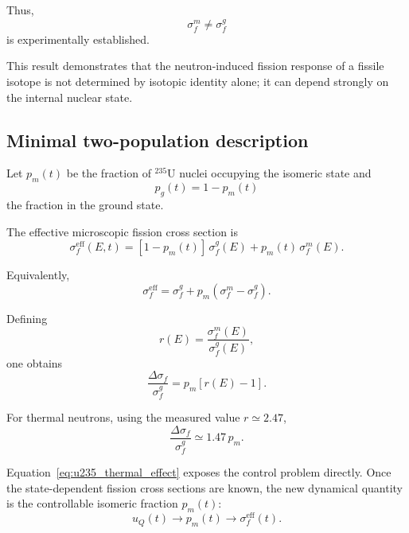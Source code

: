Thus,
\begin{equation}
\boxed{
\sigma_f^m\neq\sigma_f^g
}
\end{equation}
is experimentally established.

This result demonstrates that the neutron-induced fission response of a fissile isotope is not determined by isotopic identity alone; it can depend strongly on the internal nuclear state.

\subsection{Minimal two-population description}

Let $p_m(t)$ be the fraction of $^{235}$U nuclei occupying the isomeric state and
\begin{equation}
p_g(t)=1-p_m(t)
\end{equation}
the fraction in the ground state.

The effective microscopic fission cross section is
\begin{equation}
\sigma_f^{\mathrm{eff}}(E,t)
=
[1-p_m(t)]\,\sigma_f^g(E)
+
p_m(t)\,\sigma_f^m(E).
\end{equation}

Equivalently,
\begin{equation}
\sigma_f^{\mathrm{eff}}
=
\sigma_f^g
+
p_m
\left(
\sigma_f^m-\sigma_f^g
\right).
\end{equation}

Defining
\begin{equation}
r(E)
=
\frac{\sigma_f^m(E)}{\sigma_f^g(E)},
\end{equation}
one obtains
\begin{equation}
\frac{\Delta\sigma_f}{\sigma_f^g}
=
p_m[r(E)-1].
\end{equation}

For thermal neutrons, using the measured value $r\simeq2.47$,
\begin{equation}
\boxed{
\frac{\Delta\sigma_f}{\sigma_f^g}
\simeq
1.47\,p_m
}.
\label{eq:u235_thermal_effect}
\end{equation}

Equation~\eqref{eq:u235_thermal_effect} exposes the control problem directly. Once the state-dependent fission cross sections are known, the new dynamical quantity is the controllable isomeric fraction $p_m(t)$:
\begin{equation}
u_Q(t)
\longrightarrow
p_m(t)
\longrightarrow
\sigma_f^{\mathrm{eff}}(t).
\end{equation}

